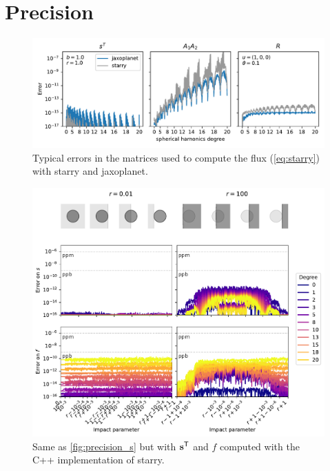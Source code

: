 \documentclass[modern]{aastex631}
\begin{document}
\section{Precision}\label{precise_precision}
\begin{figure}[H]
    \begin{center}
        \includegraphics[width=\textwidth]{../workflows/precision/figures/error_SAR.pdf}
        \caption{Typical errors in the matrices used to compute the flux (\autoref{eq:starry}) with \textsf{starry} and \textsf{jaxoplanet}. }
        \label{fig:precision_SAR}
    \end{center}
\end{figure}

\begin{figure}[H]
    \begin{center}
        \includegraphics[width=\textwidth]{../workflows/precision/figures/error_starry.pdf}
        \caption{Same as \autoref{fig:precision_s} but with ${\mathbf{s}}^\mathsf{T}$ and $f$ computed with the C++ implementation of \textsf{starry}. }
        \label{fig:precision_s_starry}
    \end{center}
\end{figure}
\end{document}
